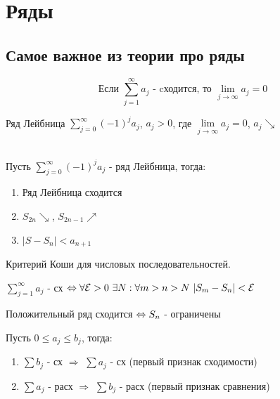 \documentclass[main]{subfiles}
\begin{document}
    \section{Ряды}

    \subsection{Самое важное из теории про ряды}

    \begin{Theorem} 
        \[\text{Если $\sum\limits_{j=1}^\infty a_j$ - cходится, то $\lim\limits_{j \rightarrow \infty} a_j = 0$}\]
    \end{Theorem}

    \begin{definition}
        Ряд Лейбница $\sum\limits_{j=0}^\infty (-1)^j a_j$, $a_j>0$, где $\lim\limits_{j \rightarrow \infty} a_j =0$, $a_j \searrow$
    \end{definition}

    \begin{theorem}\ \\
        Пусть $\sum\limits_{j=0}^\infty (-1)^j a_j$ - ряд Лейбница, тогда:
        \begin{enumerate}
            \item Ряд Лейбница сходится
            \item $S_{2n} \searrow$, $S_{2n-1} \nearrow$
            \item $|S-S_n|<a_{n+1}$
        \end{enumerate}
    \end{theorem}

    \begin{theorem}
        Критерий Коши для числовых последовательностей.

        $\sum\limits_{j=1}^\infty a_j$ - сх $\Leftrightarrow \forall \mathcal{E} > 0\ \exists N: \forall m>n>N\ |S_m-S_n|<\mathcal{E}$
    \end{theorem}

    \begin{theorem}
        Положительный ряд сходится $\Leftrightarrow S_n$ - ограничены
    \end{theorem}

    \begin{consequence}
        Пусть $0 \leqslant a_j \leqslant b_j$, тогда:
        \begin{enumerate}
            \item $\sum b_j$ - сх $\Rightarrow$ $\sum a_j$ - сх (первый признак сходимости)
            \item $\sum a_j$ - расх $\Rightarrow$ $\sum b_j$ - расх (первый признак сравнения)
        \end{enumerate}
    \end{consequence}
\end{document}
